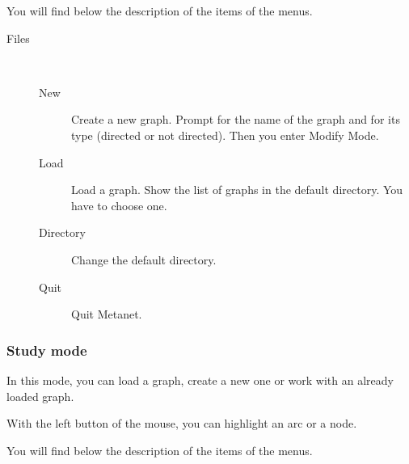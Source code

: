 \documentclass[11pt]{article}
\begin{document}
You will find below the description of the items of the menus.

\begin{description}
\item[Files]\ 
\begin{description}
  \item[New] Create a new graph. Prompt for the name of the graph and
	for its type (directed or not directed).
	Then you enter Modify Mode.
  \item[Load] Load a graph. Show the list of graphs in the default 
	directory. You have to choose one.
  \item[Directory] Change the default directory.
  \item[Quit] Quit Metanet.
\end{description}
\end{description}

\subsubsection{Study mode}

In this mode, you can load a graph, create a new one or work with an
already loaded graph.

With the left button of the mouse, you can highlight an arc or a node.

You will find below the description of the items of the menus.
\end{document}
